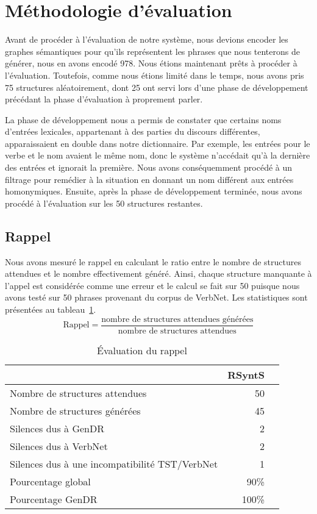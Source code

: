\section{Méthodologie d'évaluation}

Avant de procéder à l'évaluation de notre système, nous devions encoder les graphes sémantiques pour qu'ils représentent les phrases que nous tenterons de générer, nous en avons encodé 978. Nous étions maintenant prêts à procéder à l'évaluation. Toutefois, comme nous étions limité dans le temps, nous avons pris 75 structures aléatoirement, dont 25 ont servi lors d'une phase de développement précédant la phase d'évaluation à proprement parler.

La phase de développement nous a permis de constater que certains noms d'entrées lexicales, appartenant à des parties du discours différentes, apparaissaient en double dans notre dictionnaire. Par exemple, les entrées pour le verbe  et le nom  avaient le même nom, donc le système n'accédait qu'à la dernière des entrées et ignorait la première. Nous avons conséquemment procédé à un filtrage pour remédier à la situation en donnant un nom différent aux entrées homonymiques. Ensuite, après la phase de développement terminée, nous avons procédé à l'évaluation sur les 50 structures restantes.
                              
\subsection{Rappel}
Nous avons mesuré le rappel en calculant le ratio entre le nombre de structures attendues et le nombre effectivement généré. Ainsi, chaque structure manquante à l'appel est considérée comme une erreur et le calcul se fait sur 50 puisque nous avons testé sur 50 phrases provenant du corpus de VerbNet. Les statistiques sont présentées au tableau~\ref{fig:evaluationrappel}.
\[\text{Rappel} = \frac{\text{nombre de structures attendues générées}}{\text{nombre de structures attendues}}\]

\begin{table}
\caption{Évaluation du rappel}
\label{fig:evaluationrappel}
\begin{tabular}{lrr}
 \toprule
   & RSyntS\\
 \midrule
 Nombre de structures attendues   & 50\\
 Nombre de structures générées &  45\\
 Silences dus à GenDR & 2\\
 Silences dus à VerbNet    & 2\\
 Silences dus à une incompatibilité TST/VerbNet & 1\\
 \midrule
Pourcentage global & 90\% \\
Pourcentage GenDR & 100\% \\
\bottomrule
\end{tabular}
\end{table}

